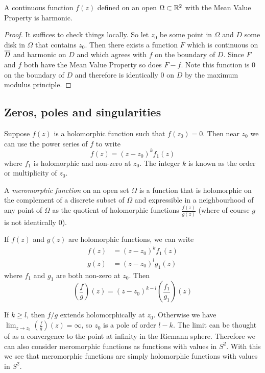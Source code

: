 \begin{corollary}
A continuous function $f(z)$ defined on an open $\Omega \subset \mathbb{R}^2$ with the Mean Value Property is harmonic.
\end{corollary}
\begin{proof} 
    It suffices to check things locally. So let $z_0$ be some point in $\Omega$ and $D$ some disk in $\Omega$ that contains $z_0$. Then there exists a function $F$ which is continuous on $\overline{D}$ and harmonic on $D$ and which agrees with $f$ on the boundary of $D$. Since $F$ and $f$ both have the Mean Value Property so does $F - f$. Note this function is 0 on the boundary of $D$ and therefore is identically 0 on $D$ by the maximum modulus principle.
\end{proof}

\subsection{Zeros, poles and singularities}
Suppose $f(z)$ is a holomorphic function such that $f(z_0) = 0$. Then near $z_0$ we can use the power series of $f$ to write
$$f(z) = (z - z_0)^k f_1(z)$$
where $f_1$ is holomorphic and non-zero at $z_0$. The integer $k$ is known as the order or multiplicity of $z_0$.

\begin{definition}
    A \textit{meromorphic function} on an open set $\Omega$ is a function that is holomorphic on the complement of a discrete subset of $\Omega$ and expressible in a neighbourhood of any point of $\Omega$ as the quotient of holomorphic functions $\frac{f(z)}{g(z)}$ (where of course $g$ is not identically 0).
\end{definition}

If $f(z)$ and $g(z)$ are holomorphic functions, we can write
\begin{align*}
    f(z) &= (z - z_0)^k f_1(z)\\
    g(z) &= (z - z_0)^l g_1(z)
\end{align*}
where $f_1$ and $g_1$ are both non-zero at $z_0$. Then
$$ \left( \frac{f}{g} \right)(z) = (z - z_0)^{k - l} \left( \frac{f_1}{g_1} \right)(z)$$

If $k \geq l$, then $f/g$ extends holomorphically at $z_0$. Otherwise we have $\lim_{z \to z_0} (\frac{f}{g})(z) = \infty$, so $z_0$ is a pole of order $l - k$. The limit can be thought of as a convergence to the point at infinity in the Riemann sphere. Therefore we can also consider meromorphic functions as functions with values in $S^2$. With this we see that meromorphic functions are simply holomorphic functions with values in $S^2$.